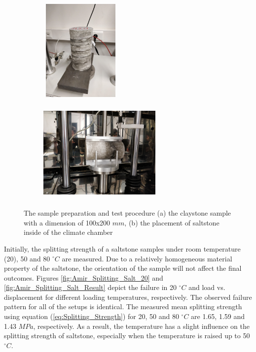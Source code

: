 \begin{figure}[!ht]
\centering
\begin{subfigure}[c]{0.3\textwidth}
\centering
\includegraphics[width=4cm,height=5cm]{figures/Amir_Splitting_Sample.png}
\subcaption{}
\label{fig:Amir_Splitting_Sample}
\end{subfigure}
\hfill
\begin{subfigure}[c]{0.6\textwidth}
\centering
\includegraphics[width=6cm,height=5cm]{figures/Amir_Splitting_Setup.png}
\subcaption{}
\label{fig:Amir_Splitting_Setup}
\end{subfigure}
\caption{The sample preparation and test procedure (a) the claystone sample with a dimension of 100x200 $mm$, (b) the placement of saltstone inside of the climate chamber}
\end{figure}

Initially, the splitting strength of a saltstone samples under room temperature (20), 50 and 80 $^{\circ}C$ are measured. Due to a relatively homogeneous material property of the saltstone, the orientation of the sample will not affect the final outcomes. Figures \ref{fig:Amir_Splitting_Salt_20} and \ref{fig:Amir_Splitting_Salt_Result} depict the failure in 20 $^{\circ}C$ and load vs. displacement for different loading temperatures, respectively. The observed failure pattern for all of the setups is identical. The measured mean splitting strength using equation (\ref{eq:Splitting_Strength}) for 20, 50 and 80 $^{\circ}C$ are 1.65, 1.59 and 1.43 $MPa$, respectively. As a result, the temperature has a slight influence on the splitting strength of saltstone, especially when the temperature is raised up to 50 $^{\circ}C$.

